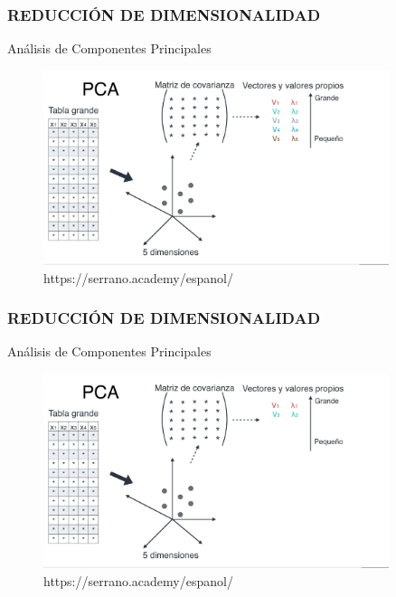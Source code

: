 \documentclass{beamer}
\begin{document}
\begin{frame}
	\frametitle{REDUCCIÓN DE DIMENSIONALIDAD}
	\begin{block}{Análisis de Componentes Principales}	
		\begin{figure}
			\includegraphics[width=0.9\textwidth]{PCA/IMG_3590.jpg}
			\caption{https://serrano.academy/espanol/}
		\end{figure}
	\end{block}
\end{frame}

\begin{frame}
	\frametitle{REDUCCIÓN DE DIMENSIONALIDAD}
	\begin{block}{Análisis de Componentes Principales}	
		\begin{figure}
			\includegraphics[width=0.9\textwidth]{PCA/IMG_3591.jpg}
			\caption{https://serrano.academy/espanol/}
		\end{figure}
	\end{block}
\end{frame}
\end{document}
